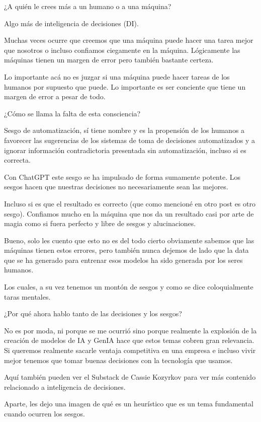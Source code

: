 ¿A quién le crees más a un humano o a una máquina?


Algo más de inteligencia de decisiones (DI).


Muchas veces ocurre que creemos que una máquina puede hacer una tarea mejor que nosotros o incluso confiamos ciegamente en la máquina. Lógicamente las máquinas tienen un margen de error pero también bastante certeza. 


Lo importante acá no es juzgar si una máquina puede hacer tareas de los humanos por supuesto que puede. Lo importante es ser conciente que tiene un margen de error a pesar de todo.


¿Cómo se llama la falta de esta consciencia? 


Sesgo de automatización, sí tiene nombre y es la propensión de los humanos a favorecer las sugerencias de los sistemas de toma de decisiones automatizados y a ignorar información contradictoria presentada sin automatización, incluso si es correcta.


Con ChatGPT este sesgo se ha impulsado de forma sumamente potente. Los sesgos hacen que nuestras decisiones no necesariamente sean las mejores. 


Incluso si es que el resultado es correcto (que como mencioné en otro post es otro sesgo). Confiamos mucho en la máquina que nos da un resultado casi por arte de magia como si fuera perfecto y libre de sesgos y alucinaciones. 


Bueno, solo les cuento que esto no es del todo cierto obviamente sabemos que las máquinas tienen estos errores, pero también nunca dejemos de lado que la data que se ha generado para entrenar esos modelos ha sido generada por los seres humanos. 


Los cuales, a su vez tenemos un montón de sesgos y como se dice coloquialmente taras mentales. 


¿Por qué ahora hablo tanto de las decisiones y los sesgos?


No es por moda, ni porque se me ocurrió sino porque realmente la explosión de la creación de modelos de IA y GenIA hace que estos temas cobren gran relevancia. Si queremos realmente sacarle ventaja competitiva en una empresa e incluso vivir mejor tenemos que tomar buenas decisiones con la tecnología que usamos. 


Aquí también pueden ver el Substack de Cassie Kozyrkov para ver más contenido relacionado a inteligencia de decisiones. 




Aparte, les dejo una imagen de qué es un heurístico que es un tema fundamental cuando ocurren los sesgos.






